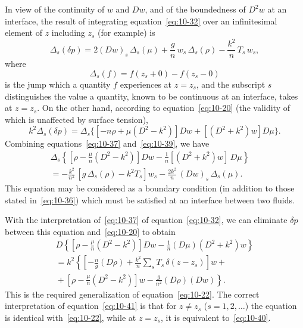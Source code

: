 In view of the continuity of $w$ and $Dw$, and of the boundedness of $D^2w$ at an interface, the result of integrating equation~\eqref{eq:10-32} over an infinitesimal element of $z$ including $z_s$ (for example) is
\begin{equation}
\label{eq:10-37}
\Delta_s(\delta p) = 2(Dw)_s\,\Delta_s(\mu)+\frac{g}{n}\,w_s\,\Delta_s(\rho)-\frac{k^2}{n}\,T_s\,w_s,
\end{equation}
where
\begin{equation}
\label{eq:10-38}
\Delta_s(f) = f(z_s+0)-f(z_s-0)
\end{equation}
is the jump which a quantity $f$ experiences at $z = z_s$, and the subscript $s$ distinguishes the value a quantity, known to be continuous at an interface, takes at $z = z_s$. On the other hand, according to equation~\eqref{eq:10-20} (the validity of which is unaffected by surface tension),
\begin{equation}
\label{eq:10-39}
k^2\Delta_s(\delta p) = \Delta_s\{[-n\rho+\mu(D^2-k^2)]Dw + [(D^2+k^2)w]D\mu\}.
\end{equation}
Combining equations~\eqref{eq:10-37} and~\eqref{eq:10-39}, we have
\begin{align}
\label{eq:10-40}
\Delta_s\!\left\{\!\left[\rho-\frac{\mu}{n}(D^2-k^2)\right]\!Dw - \frac{1}{n}[(D^2+k^2)w]\,D\mu\right\} \nonumber\\
= -\frac{k^2}{n^2}\,[g\,\Delta_s(\rho)-k^2T_s]w_s - \frac{2k^2}{n}\,(Dw)_s\,\Delta_s(\mu). \qquad
\end{align}
This equation may be considered as a boundary condition (in addition to those stated in~\eqref{eq:10-36}) which must be satisfied at an interface between two fluids.

With the interpretation of~\eqref{eq:10-37} of equation~\eqref{eq:10-32}, we can eliminate $\delta p$ between this equation and~\eqref{eq:10-20} to obtain
\begin{align}
\label{eq:10-41}
D\!\left\{\!\left[\rho-\frac{\mu}{n}(D^2-k^2)\right]\!Dw - \frac{1}{n}(D\mu)(D^2+k^2)w\right\} \nonumber\\
= k^2\!\left\{\!\left[-\frac{n}{g}(D\rho)+\frac{k^2}{n}\sum_s T_s\,\delta(z-z_s)\right]\!w + {} \right. \nonumber\\
\left. {} + \left[\rho-\frac{\mu}{n}(D^2-k^2)\right]\!w - \frac{g}{n^2}(D\rho)(Dw)\right\}.
\end{align}
This is the required generalization of equation~\eqref{eq:10-22}. The correct interpretation of equation~\eqref{eq:10-41} is that for $z \neq z_s$ ($s = 1, 2, \ldots$) the equation is identical with~\eqref{eq:10-22}, while at $z = z_s$, it is equivalent to~\eqref{eq:10-40}.

